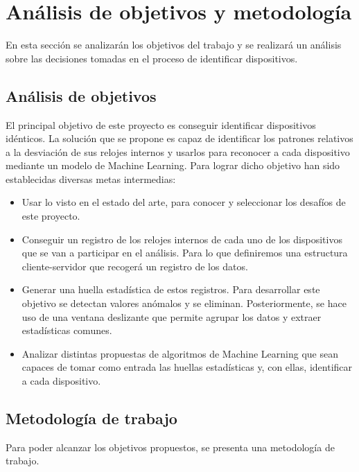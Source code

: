 
\lstset{frame=single,basicstyle=\ttfamily\small}

\chapter{Análisis de objetivos y metodología} \label{chap:meto}

En esta sección se analizarán los objetivos del trabajo y se realizará un análisis sobre las decisiones tomadas en el proceso de identificar dispositivos.

\section{Análisis de objetivos}

El principal objetivo de este proyecto es conseguir identificar dispositivos idénticos. La solución que se propone es capaz de identificar los patrones relativos a la desviación de sus relojes internos y usarlos para reconocer a cada dispositivo mediante un modelo de Machine Learning. Para lograr dicho objetivo han sido establecidas diversas metas intermedias:

\begin{itemize}
    \item Usar lo visto en el estado del arte, para conocer y seleccionar los desafíos de este proyecto.
    \item Conseguir un registro de los relojes internos de cada uno de los dispositivos que se van a participar en el análisis. Para lo que definiremos una estructura cliente-servidor que recogerá un registro de los datos.
    \item Generar una huella estadística de estos registros. Para desarrollar este objetivo se detectan valores anómalos y se eliminan. Posteriormente, se hace uso de una ventana deslizante que permite agrupar los datos y extraer estadísticas comunes.
    \item Analizar distintas propuestas de algoritmos de Machine Learning que sean capaces de tomar como entrada las huellas estadísticas y, con ellas, identificar a cada dispositivo.
\end{itemize}

\section{Metodología de trabajo}

Para poder alcanzar los objetivos propuestos, se presenta una metodología de trabajo.

